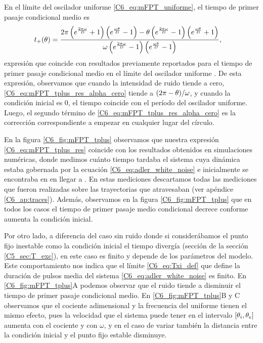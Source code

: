 \documentclass[./main.tex]{subfiles}
\begin{document}
En el límite del oscilador uniforme \ref{C6_eq:mFPT_uniforme}, el tiempo de primer pasaje condicional medio es 
\begin{align}
     t_{+}(\theta)& = \frac{2 \pi \left(e^{\frac{2 \pi \omega}{D}}+1\right) \left(e^{\frac{\omega \theta}{D}}-1\right)-\theta\left(e^{\frac{2 \pi\omega}{D}}-1\right) \left(e^{\frac{\omega \theta}{D}}+1\right)}{\omega \left(e^{\frac{2 \pi \omega}{D}}-1\right) \left(e^{\frac{\omega \theta}{D}}-1\right)},
     \label{C6_eq:mFPT_tplus_res_alpha_cero} 
\end{align}
expresión que coincide con resultados previamente reportados para el tiempo de primer pasaje condicional medio en el límite del oscilador uniforme \cite{Redner2001}. De esta expresión, observamos que cuando la intensidad de ruido tiende a cero, \ref{C6_eq:mFPT_tplus_res_alpha_cero} tiende a $(2\pi - \theta)/\omega$, y cuando la condición inicial es $0$, el tiempo coincide con el período del oscilador uniforme. Luego, el segundo término de \ref{C6_eq:mFPT_tplus_res_alpha_cero} es la corrección correspondiente a empezar en cualquier lugar \xx del círculo. 

En la figura \ref{C6_fig:mFPT_tplus} observamos que nuestra expresión \ref{C6_eq:mFPT_tplus_res} coincide con los resultados obtenidos en simulaciones numéricas, donde medimos cuánto tiempo tardaba el sistema cuya dinámica estaba gobernada por la ecuación \ref{C6_eq:adler_white_noise} e inicialmente se encontraba en \xx en llegar a \xxe. En estas mediciones descartamos todas las mediciones que fueron realizadas sobre las trayectorias que atravesaban \xxi (ver apéndice \ref{C6_ap:traces}). Además, observamos en la figura \ref{C6_fig:mFPT_tplus} que en todos los casos el tiempo de primer pasaje medio condicional decrece conforme aumenta la condición inicial. 

Por otro lado, a diferencia del caso sin ruido donde si considerábamos el punto fijo inestable como la condición inicial el tiempo divergía (sección de la sección \ref{C5_sec:T_exc}), en este caso es finito y depende de los parámetros del modelo. Este comportamiento nos indica que el límite \ref{C6_eq:Txi_def} que define la duración de pulsos media del sistema \ref{C6_eq:adler_white_noise} es finito. En \ref{C6_fig:mFPT_tplus}A podemos observar que el ruido tiende a disminuir el tiempo de primer pasaje condicional medio. En \ref{C6_fig:mFPT_tplus}B y C observamos que el cociente adimensional \dddelta y la frecuencia del uniforme tienen el mismo efecto, pues la velocidad que el sistema puede tener en el intervalo $[\theta_i,\theta_e]$ aumenta con el cociente \dddelta y con $\omega$, y en el caso de variar \dddelta también la distancia entre la condición inicial \xx y el punto fijo estable disminuye. 
\end{document}
